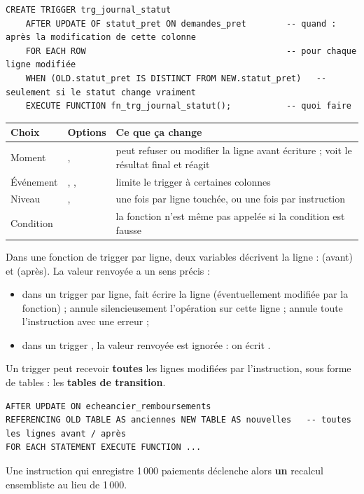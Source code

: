 \begin{lstlisting}[style=sql]
CREATE TRIGGER trg_journal_statut
    AFTER UPDATE OF statut_pret ON demandes_pret        -- quand : après la modification de cette colonne
    FOR EACH ROW                                        -- pour chaque ligne modifiée
    WHEN (OLD.statut_pret IS DISTINCT FROM NEW.statut_pret)   -- seulement si le statut change vraiment
    EXECUTE FUNCTION fn_trg_journal_statut();           -- quoi faire
\end{lstlisting}

\begin{center}\small
\begin{tabularx}{\linewidth}{@{}P{2.9cm} P{4.2cm} L@{}}
\toprule
\textbf{Choix} & \textbf{Options} & \textbf{Ce que ça change} \\
\midrule
Moment & ,  &  peut refuser ou modifier la ligne avant écriture ;
 voit le résultat final et réagit \\
Événement & , ,  &  limite le trigger à
certaines colonnes \\
Niveau & ,  & une fois par ligne touchée, ou une fois par
instruction \\
Condition &  & la fonction n'est même pas appelée si la condition est fausse \\
\bottomrule
\end{tabularx}
\end{center}

Dans une fonction de trigger par ligne, deux variables décrivent la ligne :  (avant) et
 (après). La valeur renvoyée a un sens précis :
\begin{itemize}
\item dans un trigger  par ligne,  fait écrire la ligne 
(éventuellement modifiée par la fonction) ;  annule silencieusement l'opération sur
cette ligne ;  annule toute l'instruction avec une erreur ;
\item dans un trigger , la valeur renvoyée est ignorée : on écrit .
\end{itemize}

Un trigger  peut recevoir \textbf{toutes} les lignes modifiées par
l'instruction, sous forme de tables : les \textbf{tables de transition}.
\begin{lstlisting}[style=sql]
AFTER UPDATE ON echeancier_remboursements
REFERENCING OLD TABLE AS anciennes NEW TABLE AS nouvelles   -- toutes les lignes avant / après
FOR EACH STATEMENT EXECUTE FUNCTION ...
\end{lstlisting}
Une instruction qui enregistre 1\,000 paiements déclenche alors \textbf{un} recalcul ensembliste au
lieu de 1\,000.

